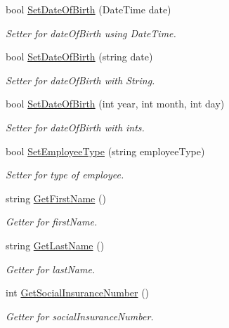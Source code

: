 \begin{DoxyCompactItemize}
bool \hyperlink{class_all_employees_1_1_employee_a058b085f3c60bbe744bd10cc1f7a2bdb}{Set\+Date\+Of\+Birth} (Date\+Time date)
\begin{DoxyCompactList}\small\item\em Setter for date\+Of\+Birth using Date\+Time. \end{DoxyCompactList}\item 
bool \hyperlink{class_all_employees_1_1_employee_a66c163e386a335040a33a583d9d20d7c}{Set\+Date\+Of\+Birth} (string date)
\begin{DoxyCompactList}\small\item\em Setter for date\+Of\+Birth with String. \end{DoxyCompactList}\item 
bool \hyperlink{class_all_employees_1_1_employee_ac095c524a6b57edd0daea893c89874f5}{Set\+Date\+Of\+Birth} (int year, int month, int day)
\begin{DoxyCompactList}\small\item\em Setter for date\+Of\+Birth with ints. \end{DoxyCompactList}\item 
bool \hyperlink{class_all_employees_1_1_employee_aabdb35f9e42e4847bc33fda68482f7ab}{Set\+Employee\+Type} (string employee\+Type)
\begin{DoxyCompactList}\small\item\em Setter for type of employee. \end{DoxyCompactList}\item 
string \hyperlink{class_all_employees_1_1_employee_ae585e71d63222bcd0b87581fc8c1f936}{Get\+First\+Name} ()
\begin{DoxyCompactList}\small\item\em Getter for first\+Name. \end{DoxyCompactList}\item 
string \hyperlink{class_all_employees_1_1_employee_afaf5dbaa12c35930b36d3582e831b407}{Get\+Last\+Name} ()
\begin{DoxyCompactList}\small\item\em Getter for last\+Name. \end{DoxyCompactList}\item 
int \hyperlink{class_all_employees_1_1_employee_a0b5c62bd8eca3acd7f0921a478d8aefa}{Get\+Social\+Insurance\+Number} ()
\begin{DoxyCompactList}\small\item\em Getter for social\+Insurance\+Number. \end{DoxyCompactList}\item 

\end{DoxyCompactItemize}
